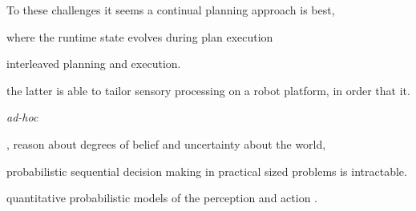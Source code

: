 \documentclass[letterpaper]{article}
\begin{document}
To these challenges it seems a continual planning approach is best, 

where the runtime state evolves during plan execution 


interleaved planning and execution. 

the latter is able to tailor sensory processing on a robot platform,
in order that it.

{\em ad-hoc} 

, reason about degrees of belief and uncertainty about the world, 

probabilistic sequential decision making in practical sized problems
is intractable.

quantitative probabilistic models of the perception and action .




\end{document}
